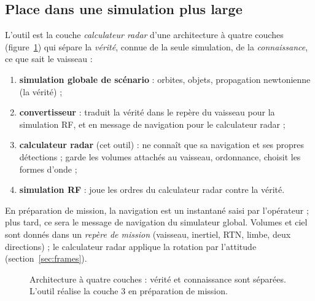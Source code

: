 \documentclass[11pt,a4paper]{article}
\begin{document}
\subsection{Place dans une simulation plus large}
L'outil est la couche \emph{calculateur radar} d'une architecture à quatre couches (figure~\ref{fig:layers}) qui
sépare la \emph{vérité}, connue de la seule simulation, de la \emph{connaissance}, ce que sait le vaisseau :
\begin{enumerate}
  \item \textbf{simulation globale de scénario} : orbites, objets, propagation newtonienne (la vérité) ;
  \item \textbf{convertisseur} : traduit la vérité dans le repère du vaisseau pour la simulation RF, et en message de
        navigation pour le calculateur radar ;
  \item \textbf{calculateur radar} (cet outil) : ne connaît que sa navigation et ses propres détections ; garde les
        volumes attachés au vaisseau, ordonnance, choisit les formes d'onde ;
  \item \textbf{simulation RF} : joue les ordres du calculateur radar contre la vérité.
\end{enumerate}
En préparation de mission, la navigation est un instantané saisi par l'opérateur ; plus tard, ce sera le message de
navigation du simulateur global. Volumes et ciel sont donnés dans un \emph{repère de mission} (vaisseau, inertiel, RTN,
limbe, deux directions) ; le calculateur radar applique la rotation par l'attitude (section~\ref{sec:frames}).

\begin{figure}[ht]
\centering
{}
\caption{Architecture à quatre couches : vérité et connaissance sont séparées. L'outil réalise la couche 3 en
préparation de mission.}
\label{fig:layers}
\end{figure}
\end{document}
